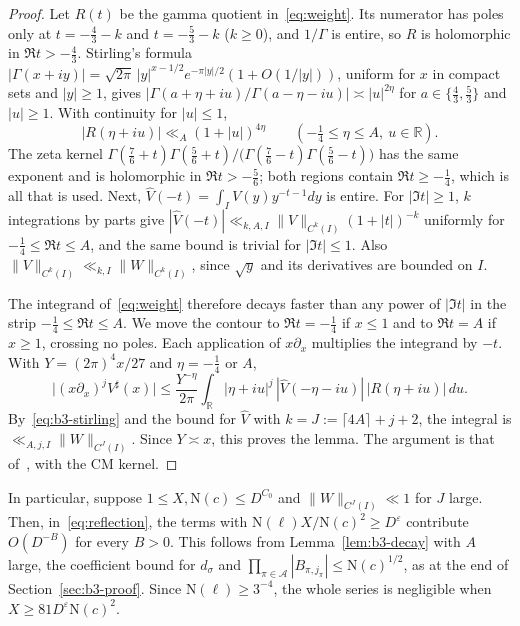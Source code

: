 \documentclass[11pt]{article}
\numberwithin{equation}{section}
\newcommand{\N}{\mathrm N}
\begin{document}
\begin{proof}
Let $R(t)$ be the gamma quotient in~\eqref{eq:weight}. Its numerator has
poles only at $t=-\frac43-k$ and $t=-\frac53-k$ ($k\ge0$), and $1/\Gamma$
is entire, so $R$ is holomorphic in $\Re t>-\frac43$. Stirling's formula~\cite[(5.11.9)]{DLMF}
$|\Gamma(x+iy)|=\sqrt{2\pi}\,|y|^{x-1/2}e^{-\pi|y|/2}(1+O(1/|y|))$, uniform
for $x$ in compact sets and $|y|\ge1$, gives
$|\Gamma(a+\eta+iu)/\Gamma(a-\eta-iu)|\asymp|u|^{2\eta}$ for
$a\in\{\frac43,\frac53\}$ and $|u|\ge1$. With continuity for $|u|\le1$,
\begin{equation}\label{eq:b3-stirling}
 |R(\eta+iu)|\ll_A(1+|u|)^{4\eta}\qquad(-\tfrac14\le\eta\le A,\ u\in\mathbb R).
\end{equation}
The zeta kernel $\Gamma(\frac76+t)\Gamma(\frac56+t)/\bigl(\Gamma(\frac76-t)\Gamma(\frac56-t)\bigr)$ has the same
exponent and is holomorphic in $\Re t>-\frac56$; both regions contain
$\Re t\ge-\frac14$, which is all that is used. Next,
$\widehat V(-t)=\int_IV(y)y^{-t-1}dy$ is entire. For $|\Im t|\ge1$,
$k$ integrations by parts give
$|\widehat V(-t)|\ll_{k,A,I}\|V\|_{C^k(I)}(1+|t|)^{-k}$ uniformly for
$-\frac14\le\Re t\le A$, and the same bound is trivial for $|\Im t|\le1$.
Also $\|V\|_{C^k(I)}\ll_{k,I}\|W\|_{C^k(I)}$, since $\sqrt y$ and its
derivatives are bounded on $I$.

The integrand of~\eqref{eq:weight} therefore decays faster than any
power of $|\Im t|$ in the strip $-\frac14\le\Re t\le A$. We move the
contour to $\Re t=-\frac14$ if $x\le1$ and to $\Re t=A$ if $x\ge1$,
crossing no poles. Each application of $x\partial_x$ multiplies the
integrand by $-t$. With $Y=(2\pi)^4x/27$ and $\eta=-\frac14$ or $A$,
\begin{equation}\label{eq:d102}
 \bigl|(x\partial_x)^jV^\sharp(x)\bigr|
 \le\frac{Y^{-\eta}}{2\pi}\int_{\mathbb R}|\eta+iu|^j\,
 |\widehat V(-\eta-iu)|\,|R(\eta+iu)|\,du .
\end{equation}
By~\eqref{eq:b3-stirling} and the bound for $\widehat V$ with
$k=J:=\lceil4A\rceil+j+2$, the integral is
$\ll_{A,j,I}\|W\|_{C^J(I)}$. Since $Y\asymp x$, this proves the lemma.
The argument is that of~\cite[(A.20)]{OAI1112}, with the CM kernel.
\end{proof}

In particular, suppose $1\le X,\N(c)\le D^{C_0}$ and
$\|W\|_{C^J(I)}\ll1$ for $J$ large. Then, in~\eqref{eq:reflection}, the
terms with $\N(\ell)X/\N(c)^2\ge D^\varepsilon$ contribute $O(D^{-B})$ for
every $B>0$. This follows from Lemma~\ref{lem:b3-decay} with $A$ large,
the coefficient bound for $d_\sigma$ and
$\prod_{\pi\in\mathcal A}|B_{\pi,j_\pi}|\le\N(c)^{1/2}$, as at the end of
Section~\ref{sec:b3-proof}. Since $\N(\ell)\ge3^{-4}$, the whole series is
negligible when $X\ge81D^\varepsilon\N(c)^2$.
\end{document}
